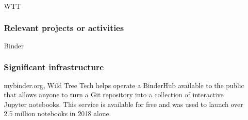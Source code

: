 \begin{sitedescription}{WTT}
\subsubsection*{Relevant projects or activities}

\begin{compactenum}
\item Binder
\end{compactenum}

\subsubsection*{Significant infrastructure}
\begin{compactenum}
\item mybinder.org, Wild Tree Tech helps operate a BinderHub available to the public that allows anyone to turn a Git repository into a collection of interactive Jupyter notebooks. This service is available for free and was used to launch over 2.5 million notebooks in 2018 alone.
\end{compactenum}

\end{sitedescription}

